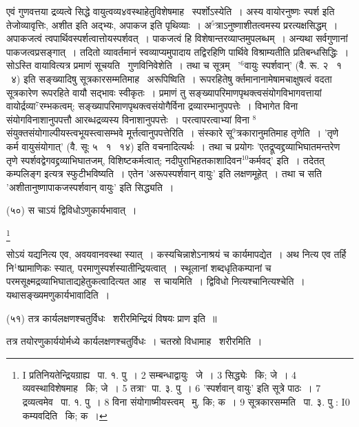 \documentclass[11pt, openany]{book}
\newcommand\blfootnote[1]{%
 \begingroup
 \renewcommand\thefootnote{}\footnote{#1}%
 \addtocounter{footnote}{-1}%
 \endgroup
}
\begin{document}
एवं गुणवत्तया द्रव्यत्वे सिद्धे वायुत्वव्य४वस्थाहेतुविशेषमाह \textendash\ {\knu स्पर्शोऽस्ये}ति~। अस्य वायोरनुष्णः स्पर्श इति तेजोव्यावृत्तिः, अशीत इति अद्भ्यः, अपाकज इति पृथिव्याः~। अ$^5$त्राऽनुष्णाशीतत्वमस्य प्ररत्यक्षसिद्धम्~। अपाकजत्वं त्वपार्थिवस्पर्शत्वात्तोयस्पर्शवत्~। पाकजत्वं हि विशेषान्तरव्याप्तमुपलब्धम्~। अन्यथा सर्वगुणानां पाकजत्वप्रसङ्गात्~। तदितो व्यावर्तमानं स्वव्याप्यमुपादाय तद्विरहिणि पार्थिवे विश्राम्यतीति प्रतिबन्धसिद्धिः~। सोऽस्ति वायावित्यत्र प्रमाणं सूचयति \textendash\ {\knu गुणविनिवेशेति}~। तथा च सूत्रम् \textendash\ '$^6$वायुः स्पर्शवान्' (वै. रू. २ \textendash\ १ \textendash\ ४) इति सङ्ख्यादिषु सूत्रकारसम्मतिमाह \textendash\ {\knu अरूपिष्वि}ति~। रूपरहितेषु र्क्तमानानामेषामचाक्षुषत्वं वदता सूत्रकारेण रूपरहिते वायौ सद्भावः स्वीकृतः~। प्रमाणं तु सङ्ख्यापरिमाणपृथक्त्वसंयोगविभागवत्तायां वायोर्द्रव्या$^7$रम्भकत्वम्; सङ्ख्यापरिमाणपृथक्त्वसंयोगैर्विना द्रव्यारम्भानुपपत्तेः~। विभागेत विना संयोगविनाशानुपपत्तौ आरब्धद्रव्यस्य विनाशानुपपत्तेः~। परत्वापरत्वाभ्यां विना ${}^8$संयुक्तसंयोगाल्पीयस्त्वभूयस्त्वासम्भवे मूर्त्तत्वानुपपत्तेरिति~। संस्कारे सू$^9$त्रकारानुमतिमाह तृणेति~। 'तृणे कर्म वायुसंयोगात्' (वै. सूः ५ \textendash\ १ \textendash\ १४) इति वचनादित्यर्थः~। तथा च प्रयोगः 'एतद्रूप्वद्द्रव्याभिघातमन्तरेण तृणे स्पर्शवद्वेगवद्द्रव्याभिघातजम्, विशिष्टकर्मत्वात्; नदीपुराभिहतकाशादिवन$^10$कर्मवद्' इति~। तदेतत् कम्पलिङ्ग इत्यत्र स्फुटीभविष्यति~। एतेन 'अरूपस्पर्शवान् वायुः' इति लक्षणमूहेत्~। तथा च सति 'अशीतानुष्णापाकजस्पर्शवान् वायुः' इति सिद्ध्यति~। 

{\knu (५०) स चाऽयं द्विविधोऽणुकार्यभावात्~।}

\blfootnote{I प्रतिनियतेन्द्रियग्राह्य \textendash\ पा. १. पु~। 2 सम्बन्धाद्वायुः \textendash\ जे~। 3 सिद्ध्येः \textendash\ कि; जे~। 4 व्यवस्थाविशेषमाह \textendash\ कि; जे~। 5 तत्रा$^\circ$\textendash\ पा. ३. पु~। 6 'स्पर्शवान् वायुः' इति सूत्रे पाठः~। 7 द्रव्यत्वमेव \textendash\ पा. १. पु~। 8 विना संयोगाष्मीयस्त्वम् \textendash\ मु. कि; क~। 9 सूत्रकारसम्मति \textendash\ पा. ३. पु : I0 कम्यवदिति \textendash\ कि; क~।}

\newpage
सोऽयं यद्यनित्य एव, अवयवानवस्था स्यात्~। कस्यचिन्नाशेऽनाश्रयं च कार्यमापद्येत~। अथ नित्य एव तर्हि नि$^1$ष्प्रामाणिकः स्यात्, परमाणुस्पर्शस्यातीन्द्रियत्वात्~। स्थूलानां शब्दधृतिकम्पानां च परमसूक्ष्मद्रव्याभिघाताद्यहेतुकत्वादित्यत आह \textendash\ {\knu स चायमिति}~। द्विविधो नित्यश्चानित्यश्चेति~। यथासङ्ख्यमणुकार्यभावादिति~। 

\hangindent=2cm {\knu (५१) तत्र कार्यलक्षणश्चतुर्विधः \textendash\ शरीरमिन्द्रियं विषयः प्राण इति~॥}

तत्र तयोरणुकार्ययोर्मध्ये कार्यलक्षणश्चतुर्विधः~। चतस्रो विधामाह \textendash\ {\knu शरीरमि}ति~। 
\end{document}

